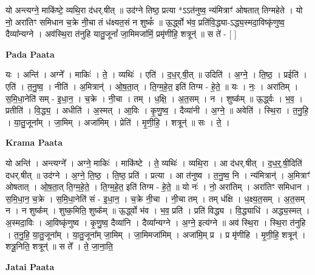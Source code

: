 \documentclass[17pt]{extarticle}
\begin{document}
यो अन्त्यग्ने॒ माकि॑ष्टे॒ व्यथि॒रा द॑धर्.षीत् ॥ उद॑ग्ने तिष्ठ॒ प्रत्या *ऽऽत॑नुष्व॒ न्य॑मित्राꣳ॑ ओषतात् तिग्महेते । यो नो॒ अरा॑तिꣳ समिधान च॒क्रे नी॒चा तं ध॑क्ष्यत॒सं न शुष्कं᳚ ॥ ऊ॒र्द्ध्वो भ॑व॒ प्रति॑वि॒द्ध्या-ऽद्ध्य॒स्मदा॒विष्कृ॑णुष्व॒ दैव्या᳚न्यग्ने । अव॑स्थि॒रा त॑नुहि यातु॒जूनां᳚ जा॒मिमजा॑मिं॒ प्रमृ॑णीहि॒ शत्रून्॑ ॥ स ते॑ - [ ] \newline

\textbf{Pada Paata} \newline

यः । अन्ति॑ । अग्ने᳚ । माकिः॑ । ते॒ । व्यथिः॑ । एति॑ । द॒ध॒र्.षी॒त् ॥ उदिति॑ । अ॒ग्ने॒ । ति॒ष्ठ॒ । प्रईति॑ । एति॑ । त॒नु॒ष्व॒ । नीति॑ । अ॒मित्रान्॑ । ओ॒ष॒ता॒त् । ति॒ग्म॒हे॒त॒ इति॑ तिग्म - हे॒ते॒ ॥ यः । नः॒ । अरा॑तिम् । स॒मि॒धा॒नेति॑ सम् - इ॒धा॒न॒ । च॒क्रे । नी॒चा । तम् । ध॒क्षि॒ । अ॒त॒सम् । न । शुष्क᳚म् ॥ ऊ॒र्द्ध्वः । भ॒व॒ । प्रतीति॑ । वि॒द्ध्य॒ । अधीति॑ । अ॒स्मत् । आ॒विः । कृ॒णु॒ष्व॒ । दैव्या॑नी । अ॒ग्ने॒ ॥ अवेति॑ । स्थि॒रा । त॒नु॒हि॒ । या॒तु॒जूना᳚म् । जा॒मिम् । अजा॑मिम् । प्रेति॑ । मृ॒णी॒हि॒ । शत्रून्॑ ॥ सः । ते॒ ।  \newline


\textbf{Krama Paata} \newline

यो अन्ति॑ । अन्त्यग्ने᳚ । अग्ने॒ माकिः॑ । माकि॑ष्टे । ते॒ व्यथिः॑ । व्यथि॒रा । आ द॑धर्.षीत् । द॒ध॒र्॒.षी॒दिति॑ दधर्.षीत् ॥ उद॑ग्ने । अ॒ग्ने॒ ति॒ष्ठ॒ । ति॒ष्ठ॒ प्रति॑ । प्रत्या । आ त॑नुष्व । त॒नु॒ष्व॒ नि । न्य॑मित्रान्॑ । अ॒मित्राꣳ॑ ओषतात् । ओ॒ष॒ता॒त् ति॒ग्म॒हे॒ते॒ । ति॒ग्म॒हे॒त॒ इति॑ तिग्म - हे॒ते॒ ॥ यो नः॑ । नो॒ अरा॑तिम् । अरा॑तिꣳ समिधान । स॒मि॒धा॒न॒ च॒क्रे । स॒मि॒धा॒नेति॑ सं - इ॒धा॒न॒ । च॒क्रे नी॒चा । नी॒चा तम् । तम् ध॑क्षि । ध॒क्ष्य॒त॒सम् । अ॒त॒सम् न । न शुष्क᳚म् । शुष्क॒मिति॒ शुष्क᳚म् ॥ ऊ॒र्द्ध्वो भ॑व । भ॒व॒ प्रति॑ । प्रति॑ विद्ध्य । वि॒द्ध्याधि॑ । अद्ध्य॒स्मत् । अ॒स्मदा॒विः । आ॒विष्कृ॑णुष्व । कृ॒णु॒ष्व॒ दैव्या॑नि । दैव्या᳚न्यग्ने । अ॒ग्ने॒ इत्य॑ग्ने ॥ अव॑ स्थि॒रा । स्थि॒रा त॑नुहि । त॒नु॒हि॒ या॒तु॒जूना᳚म् । या॒तु॒जूना᳚म् जा॒मिम् । जा॒मिमजा॑मिम् । अजा॑मि॒म् प्र । प्र मृ॑णीहि । मृ॒णी॒हि॒ शत्रून्॑ । शत्रू॒निति॒ शत्रून्॑ ॥ 
स ते᳚ । ते॒ जा॒ना॒ति॒ \newline

\textbf{Jatai Paata} \newline
\end{document}
